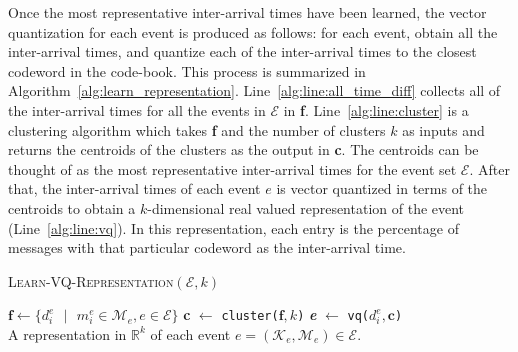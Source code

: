 Once the most representative inter-arrival times have been learned, the vector
quantization for each event is produced as follows: 
%
for each event, obtain all the inter-arrival times, and quantize each of the
inter-arrival times to the closest codeword in the code-book.  
%
This process is summarized in Algorithm~\ref{alg:learn_representation}.
%
Line~\ref{alg:line:all_time_diff} collects all of the inter-arrival times for all
the events in $\mathcal{E}$ in \textbf{f}. 
%
Line~\ref{alg:line:cluster} is a clustering algorithm which takes \textbf{f} and
the number of clusters $k$ as inputs and returns the centroids of the clusters
as the output in \textbf{c}. 
%
The centroids can be thought of as the most representative inter-arrival times
for the event set $\mathcal{E}$. 
%
After that, the inter-arrival times of each event $e$ is vector quantized in
terms of the centroids to obtain a $k$-dimensional real valued representation of
the event (Line~\ref{alg:line:vq}). 
%
In this representation, each entry is the percentage of messages with that
particular codeword as the inter-arrival time.

\begin{algorithm}
  \caption{{\scshape Learn-VQ-Representation}$(\mathcal{E}, k)$}
  \label{alg:learn_representation}
  \begin{algorithmic}[1]
    \STATE $\textbf{f} \gets \{d_{i}^\mathit{e}\text{ } | \text{ } m_{\mathit{i}}^\mathit{e} \in
    \mathcal{M}_\mathit{e}, \mathit{e} \in \mathcal{E} \}$ \label{alg:line:all_time_diff}
    \STATE \textbf{c} $\gets$ {\tt cluster(}$\textbf{f}, k${\tt)} \label{alg:line:cluster}
      \STATE \textbf{\textit{e}} $\gets$ {\tt vq(}$d_{i}^\mathit{e}, \textbf{c}${\tt)}\\ \label{alg:line:vq}
    \ENDFOR
    \RETURN A representation in $\mathbb{R}^{k}$ of each event $\mathit{e} = (\mathcal{K}_\mathit{e}, \mathcal{M}_e) \in \mathcal{E}$.
  \end{algorithmic}
\end{algorithm}

